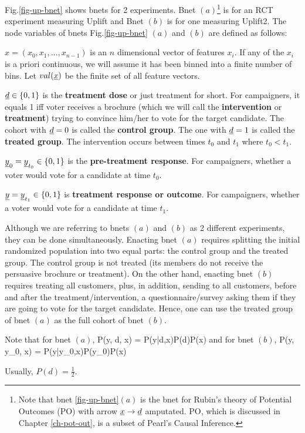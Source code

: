 Fig.\ref{fig-up-bnet} shows bnets for 2 experiments. Bnet $(a)$\footnote{
Note that bnet \ref{fig-up-bnet}$(a)$ 
is the bnet for Rubin's theory of 
Potential Outcomes (PO)
with arrow $\rvx\rarrow \rvd$ amputated.
PO, which is
discussed in Chapter \ref{ch-pot-out},
 is a subset
of Pearl's Causal Inference.
} is for an RCT experiment measuring 
Uplift and Bnet $(b)$ is for one measuring Uplift2. 
The node variables of bnets Fig.\ref{fig-up-bnet}
$(a)$ and $(b)$
are defined as follows:

$x=(x_0, x_1,\dots, x_{n-1})$ is an $n$ dimensional 
vector of features $x_i$. If any of the $x_i$
is a priori continuous, we will
assume it has  been binned into
a finite number of bins.
Let $val(\rvx)$ be the finite set of  all feature vectors.

$\rvd\in\bool$ is the {\bf treatment dose} or just treatment for short. For campaigners, it equals 1 iff voter receives
a brochure (which
we will call the {\bf intervention}
or {\bf treatment}) trying to convince him/her to vote 
for the target  candidate. The cohort with $\rvd=0$ is called the {\bf control group}. The one with $\rvd=1$ is called the {\bf treated group}.
The intervention occurs between times $t_0$ and $t_1$
where $t_0<t_1$.

$\rvy_0=\rvy_{t_0}\in \bool$ is the 
{\bf pre-treatment response}. For campaigners, whether a voter would
vote for a candidate at time $t_0$.

$\rvy=\rvy_{t_1}\in \bool$
is {\bf treatment response or outcome}. For campaigners, whether a voter would
vote for a candidate at time $t_1$. 

Although we are referring to bnets $(a)$
and $(b)$ as 2 different experiments, they can be done
simultaneously. Enacting
bnet $(a)$ requires splitting the initial 
randomized population into two equal parts:
the control group and the treated group.
The control group is not treated (its members do
not receive the persuasive brochure or treatment). On the other hand, enacting bnet $(b)$ requires
treating all customers, plus, in addition,
sending to 
all customers, before
and after the treatment/intervention, a questionnaire/survey  
asking them if they are going to
vote for the target candidate.
Hence, one can use the treated group of
bnet $(a)$ as the full cohort of bnet $(b)$.

Note that for bnet $(a)$, 
\beq
P(y, d, x) = P(y|d,x)P(d)P(x)
\eeq
and for bnet $(b)$,
\beq
P(y, y_0, x) = P(y|y_0,x)P(y_0)P(x)
\eeq

Usually, $P(d) = \frac{1}{2}$.

